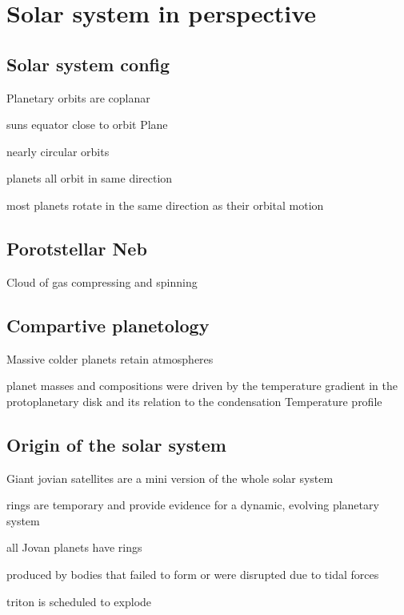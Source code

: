 \documentclass{article}
\begin{document}
\setcounter{section}{11}
\section{Solar system in perspective}
\subsection{Solar system config}
\begin{list}{-}{}
\item Planetary orbits are coplanar 
\item suns equator close to orbit Plane
\item nearly circular orbits
\item planets all orbit in same direction
\item most planets rotate in the same direction as their orbital motion
\end{list}
\subsection{Porotstellar Neb}
\begin{list}{-}{}
\item Cloud of gas compressing and spinning 
\end{list}

\subsection{Compartive planetology}
\begin{list}{-}{}
\item Massive colder planets retain atmospheres
\item planet masses and compositions were driven by the temperature gradient in the protoplanetary disk and its relation to the condensation Temperature profile
\end{list}

\subsection{Origin of the solar system}
\begin{list}{-}{}
\item Giant jovian satellites are a mini version of the whole solar system
\item rings are temporary and provide evidence for a dynamic, evolving planetary system
\begin{list}{-}{}
\item all Jovan planets have rings
\item produced by bodies that failed to form or were disrupted due to tidal forces 
\item triton is scheduled to explode
\end{list}
\end{list}
\end{document}
